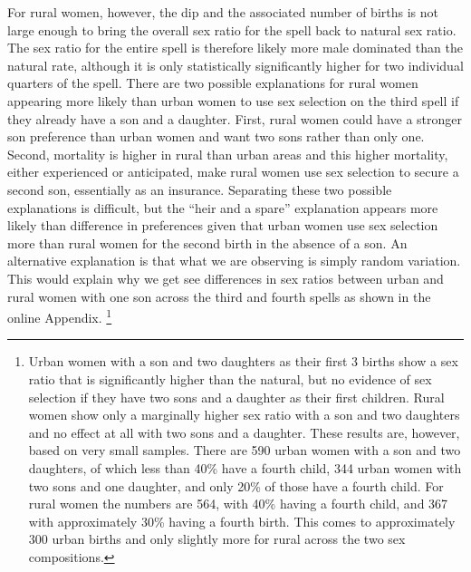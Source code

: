 \documentclass[12pt,letterpaper]{article}
\begin{document}

For rural women, however, the dip and the associated number of births is not
large enough to bring the overall sex ratio for the spell back to natural sex ratio.
The sex ratio for the entire spell is therefore likely more male dominated
than the natural rate, although it is only statistically significantly higher for two 
individual quarters of the spell.
There are two possible explanations for rural women appearing more likely than urban
women to use sex selection on the third spell if they already have a son and a daughter.
First, rural women could have a stronger son preference than urban women and want two sons 
rather than only one.
Second, mortality is higher in rural than urban areas and this higher mortality, either 
experienced or anticipated, make rural women use sex selection to secure a second son, 
essentially as an insurance.
Separating these two possible explanations is difficult, but the ``heir and a spare''
explanation appears  more likely than difference in preferences given that urban women use 
sex selection more than rural women for the second birth in the absence of a son.
An alternative explanation is that what we are observing is simply random variation.
This would explain why we get see differences in sex ratios between urban and rural
women with one son across the third and fourth spells as shown in the online Appendix.%
\footnote{
Urban women with a son and two daughters as their first 3 births show a sex ratio
that is significantly higher than the natural, but no evidence of sex
selection if they have two sons and a daughter as their first children.
Rural women show only a marginally higher sex ratio with a son and two daughters and no 
effect at all with two sons and a daughter.
These results are, however, based on very small samples.
There are 590 urban women with a son and two daughters, of which less than 40\% have a
fourth child, 344 urban women with two sons and one daughter, and only 20\% of those
have a fourth child.
For rural women the numbers are 564, with 40\% having a fourth child, and 367 with
approximately 30\% having a fourth birth.
This comes to approximately 300 urban births and only slightly more for rural across
the two sex compositions.
}
\end{document}
